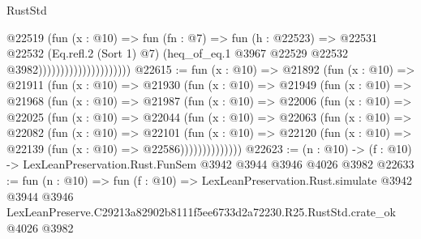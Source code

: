 \begin{lexlean}{RustStd}
\begin{coremodule}
                                        @22519
                                          (fun (x : @10) =>
                                          fun (fn : @7) =>
                                          fun (h : @22523) =>
                                          @22531
                                            @22532
                                            (Eq.refl.{2} (Sort 1) @7)
                                            (heq_of_eq.{1}
                                              @3967
                                              @22529
                                              @22532
                                              @3982)))))))))))))))))))))
@22615 := fun (x : @10) =>
  @21892
    (fun (x : @10) =>
    @21911
      (fun (x : @10) =>
      @21930
        (fun (x : @10) =>
        @21949
          (fun (x : @10) =>
          @21968
            (fun (x : @10) =>
            @21987
              (fun (x : @10) =>
              @22006
                (fun (x : @10) =>
                @22025
                  (fun (x : @10) =>
                  @22044
                    (fun (x : @10) =>
                    @22063
                      (fun (x : @10) =>
                      @22082
                        (fun (x : @10) =>
                        @22101
                          (fun (x : @10) =>
                          @22120 (fun (x : @10) => @22139 (fun (x : @10) => @22586))))))))))))))
@22623 := (n : @10) -> (f : @10) -> LexLeanPreservation.Rust.FunSem @3942 @3944 @3946 @4026 @3982
@22633 := fun (n : @10) =>
  fun (f : @10) =>
  LexLeanPreservation.Rust.simulate
    @3942
    @3944
    @3946
    LexLeanPreserve.C29213a82902b8111f5ee6733d2a72230.R25.RustStd.crate_ok
    @4026
    @3982
\end{coremodule}
\end{lexlean}
